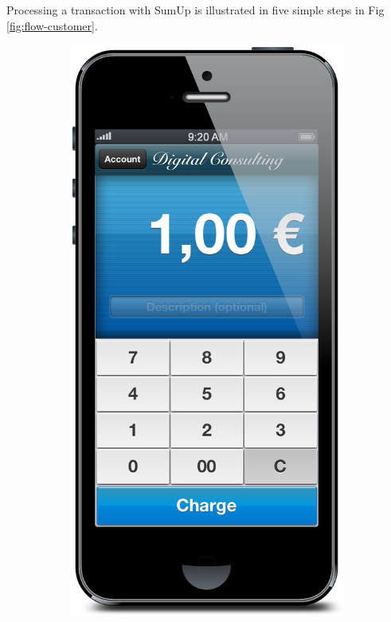 \documentclass[a4paper, oneside]{csthesis}
\begin{document}
Processing a transaction with SumUp is illustrated in five simple steps in Fig \ref{fig:flow-customer}.

\begin{figure}
        \centering
        \begin{subfigure}[b]{0.16\textwidth}
                \centering
                \includegraphics[width=\textwidth]{figures/flow1.png}

\end{subfigure}
\end{figure}
\end{document}

